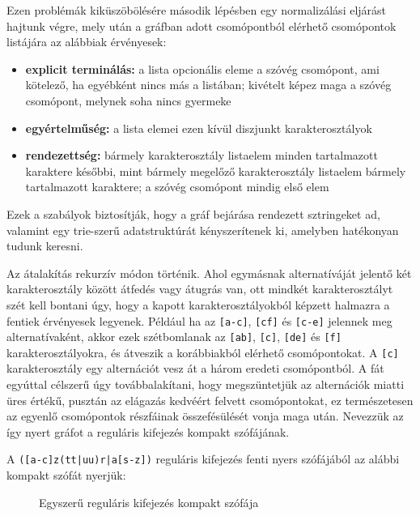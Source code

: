 \documentclass[
    parspace,
    noindent,
    nohyp,
]{elteiktdk}[2023/04/10]
\begin{document}
Ezen problémák kiküszöbölésére második lépésben egy normalizálási eljárást hajtunk végre,
mely után a gráfban adott csomópontból elérhető csomópontok listájára az alábbiak érvényesek:

\begin{itemize}
    \item \textbf{explicit terminálás:} a lista opcionális eleme a szóvég csomópont, ami kötelező, ha egyébként nincs más a listában; kivételt képez maga a szóvég csomópont, melynek soha nincs gyermeke
    \item \textbf{egyértelműség:} a lista elemei ezen kívül diszjunkt karakterosztályok
    \item \textbf{rendezettség:} bármely karakterosztály listaelem minden tartalmazott karaktere későbbi, mint bármely megelőző karakterosztály listaelem bármely tartalmazott karaktere; a szóvég csomópont mindig első elem
\end{itemize}

Ezek a szabályok biztosítják, hogy a gráf bejárása rendezett sztringeket ad,
valamint egy trie-szerű adatstruktúrát kényszerítenek ki, amelyben hatékonyan tudunk keresni.

Az átalakítás rekurzív módon történik.
Ahol egymásnak alternatíváját jelentő két karakterosztály között átfedés vagy átugrás van,
ott mindkét karakterosztályt szét kell bontani úgy,
hogy a kapott karakterosztályokból képzett halmazra a fentiek érvényesek legyenek.
Például ha az \texttt{[a-c]}, \texttt{[cf]} és \texttt{[c-e]} jelennek meg alternatívaként,
akkor ezek szétbomlanak az \texttt{[ab]}, \texttt{[c]}, \texttt{[de]} és \texttt{[f]}
karakterosztályokra, és átveszik a korábbiakból elérhető csomópontokat.
A \texttt{[c]} karakterosztály egy alternációt vesz át a három eredeti csomópontból.
A fát egyúttal célszerű úgy továbbalakítani, hogy megszüntetjük az alternációk miatti üres értékű,
pusztán az elágazás kedvéért felvett csomópontokat,
ez természetesen az egyenlő csomópontok részfáinak összefésülését vonja maga után.
Nevezzük az így nyert gráfot a reguláris kifejezés kompakt szófájának.


A \texttt{([a-c]z(tt|uu)r|a[s-z])} reguláris kifejezés fenti nyers szófájából
az alábbi kompakt szófát nyerjük:

\begin{figure}[H]
\centering

\caption{Egyszerű reguláris kifejezés kompakt szófája}
\end{figure}
\end{document}
